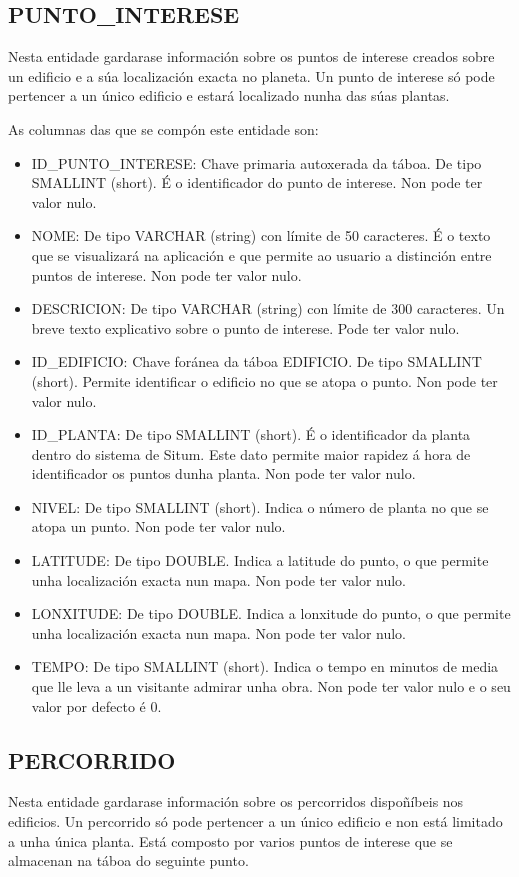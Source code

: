 \subsection{PUNTO\_INTERESE}
Nesta entidade gardarase información sobre os puntos de interese creados sobre un edificio e a súa localización exacta no planeta. Un punto de interese só pode pertencer a un único edificio e estará localizado nunha das súas plantas.

As columnas das que se compón este entidade son:
\begin{itemize}
	\item ID\_PUNTO\_INTERESE: Chave primaria autoxerada da táboa. De tipo SMALLINT (short). É o identificador do punto de interese. Non pode ter valor nulo.
	\item NOME: De tipo VARCHAR (string) con límite de 50 caracteres. É o texto que se visualizará na aplicación e que permite ao usuario a distinción entre puntos de interese. Non pode ter valor nulo.
	\item DESCRICION: De tipo VARCHAR (string) con límite de 300 caracteres. Un breve texto explicativo sobre o punto de interese. Pode ter valor nulo.
	\item ID\_EDIFICIO: Chave foránea da táboa EDIFICIO. De tipo SMALLINT (short). Permite identificar o edificio no que se atopa o punto. Non pode ter valor nulo.
	\item ID\_PLANTA: De tipo SMALLINT (short). É o identificador da planta dentro do sistema de Situm. Este dato permite maior rapidez á hora de identificador os puntos dunha planta. Non pode ter valor nulo.
	\item NIVEL: De tipo SMALLINT (short). Indica o número de planta no que se atopa un punto. Non pode ter valor nulo.
	\item LATITUDE: De tipo DOUBLE. Indica a latitude do punto, o que permite unha localización exacta nun mapa. Non pode ter valor nulo.
	\item LONXITUDE: De tipo DOUBLE. Indica a lonxitude do punto, o que permite unha localización exacta nun mapa. Non pode ter valor nulo.
	\item TEMPO: De tipo SMALLINT (short). Indica o tempo en minutos de media que lle leva a un visitante admirar unha obra. Non pode ter valor nulo e o seu valor por defecto é 0.
\end{itemize}


\subsection{PERCORRIDO}
Nesta entidade gardarase información sobre os percorridos dispoñíbeis nos edificios. Un percorrido só pode pertencer a un único edificio e non está limitado a unha única planta. Está composto por varios puntos de interese que se almacenan na táboa do seguinte punto.


